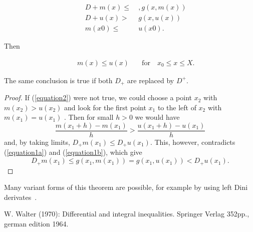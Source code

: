 \documentclass[a4paper,11pt,fleqn]{article}
\begin{document}
\begin{subequations}
\begin{align}
&&D + m(x) \leq& \:,g (x, m(x))\label{equation1a}\\
&&D + u(x) >& \:g(x, u(x))\label{equation1b}\\
&&m(x0) \leq& \:u(x0)\label{equation1c}.
\end{align}
\end{subequations}
 
Then
 
\begin{align}\label{equation2}
&&m(x) \leq u(x)\quad &\text{for}\quad x_0 \leq x \leq X.
\end{align}
 
The same conclusion is true if both $D_+$ are replaced by $D^+$.
\begin{proof}
If (\ref{equation2}) were not true, we could choose a point $x_2$ with $m(x_2) > u(x_2)$ and look for the first
point $x_1$ to the left of $x_2$ with $m(x_1) = u(x_1)$ . Then for small $h > 0$ we would have
$$\frac{m(x_1 + h) - m(x_1)}{h} > \frac{u(x_1 + h) - u(x_1)}{h}$$
and, by taking limits, $D_+m(x_1) \leq D_+u(x_1)$. This, however, contradicts (\ref{equation1a}) and (\ref{equation1b}), which give
$$D_+m(x_1) \leq g(x_1, m(x_1)) = g(x_1, u(x_1)) < D_+u(x_1).$$
\end{proof}
Many variant forms of this theorem are possible, for example by using left Dini derivates~\cite[Chap. II, §8, Theorem V]{Walter}.
 
\begin{thebibliography}{1}
W. Walter (1970): Differential and integral inequalities. Springer Verlag 352pp., german edition 1964.
\end{thebibliography}
 
\end{document}
